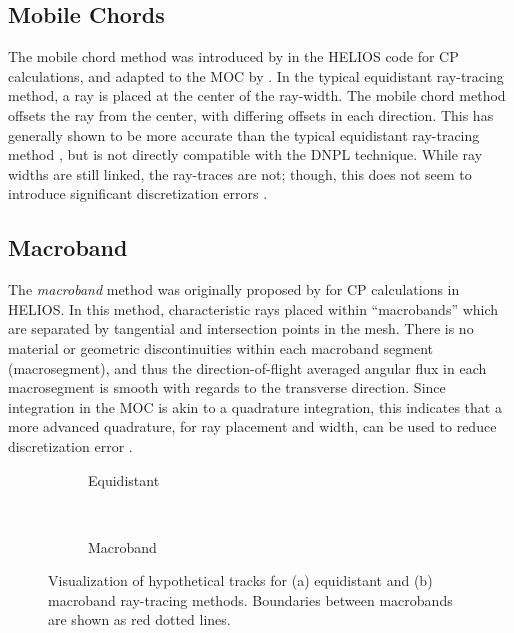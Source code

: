 {{      \subsection{Mobile Chords}{\label{ssec:RT:Mobile Chords}
        The mobile chord method was introduced by \citet{Villarino1992} in the HELIOS code for \ac{CP} calculations, and adapted to the \ac{MOC} by \citet{Yamamoto2008}.
        In the typical equidistant ray-tracing method, a ray is placed at the center of the ray-width.
        The mobile chord method offsets the ray from the center, with differing offsets in each direction.
        This has generally shown to be more accurate than the typical equidistant ray-tracing method \cite{Yamamoto2008}, but is not directly compatible with the \ac{DNPL} technique.
        While ray widths are still linked, the ray-traces are not; though, this does not seem to introduce significant discretization errors \cite{Yamamoto2008}.
      }

      \subsection{Macroband}{\label{ssec:RT:Macroband}
        The \emph{macroband} method  was originally proposed by \citet{Villarino1992} for \ac{CP} calculations in HELIOS.
        In this method, characteristic rays placed within ``macrobands'' which are separated by tangential and intersection points in the mesh.
        There is no material or geometric discontinuities within each macroband segment (macrosegment), and thus the direction-of-flight averaged angular flux in each macrosegment is smooth with regards to the transverse direction.
        Since integration in the \ac{MOC} is akin to a quadrature integration, this indicates that a more advanced quadrature, for ray placement and width, can be used to reduce discretization error \cite{Yamamoto2005}.

        \begin{figure}[h]
          \centering
          \begin{subfigure}[t]{0.45\linewidth}
            \centering
            \def\svgwidth{0.85\linewidth}
            
            \caption{Equidistant}
          \end{subfigure}%
          ~
          \begin{subfigure}[t]{0.45\linewidth}
              \centering
            \def\svgwidth{0.85\linewidth}
            
            \caption{Macroband}
          \end{subfigure}
          \caption{Visualization of hypothetical tracks for (a) equidistant and (b) macroband ray-tracing methods. Boundaries between macrobands are shown as red dotted lines.}
          \label{fig:RT:Equidisant vs Macroband}
        \end{figure}

}}}
